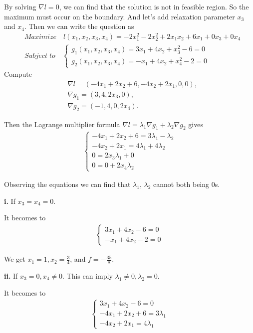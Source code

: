 \documentclass{report}
\begin{document}
By solving $\nabla l = 0$, we can find that the solution is not in feasible region.
So the maximum must occur on the boundary. And let's add relaxation parameter $x_3$ and $x_4$. 
Then we can write the question as 
\begin{align*}
    &Maximize \quad l(x_1,x_2,x_3,x_4) = -2x_1 ^{2}-2x_2 ^{2}+2x_1 x_2+6x_1+0x_3+0x_4\\
    &Subject\; to \quad \begin{cases}
        g_1(x_1,x_2,x_3,x_4) =3x_1 +4x_2+x_3 ^{2}-6=0\\
        g_2(x_1,x_2,x_3,x_4) =-x_1 +4x_2+x_4^{2}-2=0       
    \end{cases}
\end{align*}
Compute
\begin{align*}
    &\nabla l=(-4x_1+2x_2+6,-4x_2+2x_1,0,0),\\
    &\nabla g_1=(3,4,2x_3,0),\\
    &\nabla g_2=(-1,4,0,2x_4).
\end{align*}

Then the Lagrange multiplier formula $\nabla l =\lambda_1 \nabla g_1+\lambda_2 \nabla g_2$ gives
\begin{align*}
    \begin{cases}
        -4x_1+2x_2+6=3\lambda_1 -\lambda_2\\
        -4x_2+2x_1=4\lambda_1 +4\lambda_2\\
        0=2x_3 \lambda_1 +0\\
        0=0+2x_4 \lambda_2
    \end{cases}
\end{align*}

\par 
Observing the equations we can find that $\lambda_1$, $\lambda_2$ cannot both being 0s. 

\par
{\bf i.} If $x_3=x_4=0$.  
\par It becomes to 
\begin{align*}
    \begin{cases}
        3x_1 +4x_2-6=0 \\
        -x_1 +4x_2-2=0
    \end{cases}
\end{align*}

\noindent
We get $x_1=1,x_2=\frac{3}{4}$, and $f=-\frac{35}{8}$. 

{\bf ii.} If $x_3=0,x_4\neq 0$. This can imply $\lambda_1\neq 0,\lambda_2 =0$. 
\par It becomes to 
\begin{align*}
    \begin{cases}
        3x_1 +4x_2-6=0\\
        -4x_1+2x_2+6=3\lambda_1\\
        -4x_2+2x_1=4\lambda_1
    \end{cases}
\end{align*}
\end{document}
